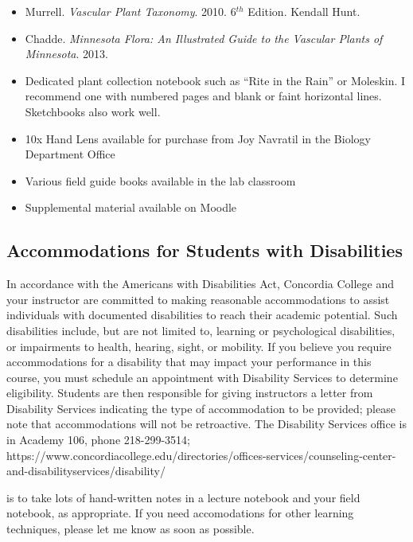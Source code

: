 \documentclass{tufte-handout}
\begin{document}
\begin{fullwidth}
\begin{itemize}
	\item Murrell. \emph{Vascular Plant Taxonomy}. 2010. 6$^{th}$ Edition. Kendall Hunt.
	\item Chadde. \emph{Minnesota Flora: An Illustrated Guide to the Vascular Plants of Minnesota}. 2013. 
	\item Dedicated plant collection notebook such as ``Rite in the Rain'' or Moleskin. I recommend one with numbered pages and blank or faint horizontal lines. Sketchbooks also work well.
	\item 10x Hand Lens available for purchase from Joy Navratil in the Biology Department Office
	\item Various field guide books available in the lab classroom
	\item Supplemental material available on Moodle
\end{itemize}


\subsection{Accommodations for Students with Disabilities}

In accordance with the Americans with Disabilities Act, Concordia College and your instructor are committed to making reasonable accommodations to assist individuals with documented disabilities to reach their academic potential. Such disabilities include, but are not limited to, learning or psychological disabilities, or impairments to health, hearing, sight, or mobility. If you believe you require accommodations for a disability that may impact your performance in this course, you must schedule an appointment with Disability Services to determine eligibility. Students are then responsible for giving instructors a letter from Disability Services indicating the type of accommodation to be provided; please note that accommodations will not be retroactive. The Disability Services office is in Academy 106, phone 218-299-3514; https://www.concordiacollege.edu/directories/offices-services/counseling-center-and-disabilityservices/disability/ 

 is to take lots of hand-written notes in a lecture notebook and your field notebook, as appropriate. If you need accomodations for other learning techniques, please let me know as soon as possible. 


\end{fullwidth}
\end{document}
